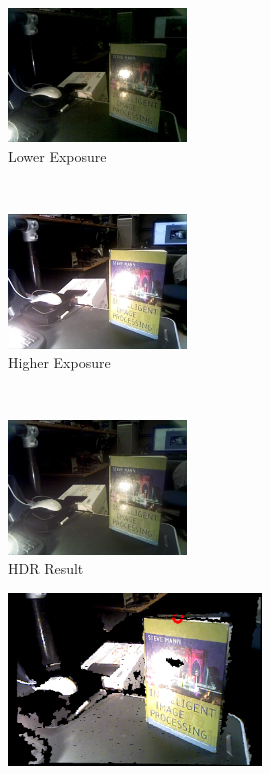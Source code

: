 \begin{figure}[t!]
    \centering
    \begin{subfigure}{0.32\textwidth}
        \centering
        \includegraphics[height=1.4in]{ch4/diagrams/hdr_results/low.jpg}
        \caption{Lower Exposure}
        \label{hdr_low_expos}
    \end{subfigure}%
    ~ 
    \begin{subfigure}{0.32\textwidth}
        \centering
        \includegraphics[height=1.4in]{ch4/diagrams/hdr_results/high.jpg}
        \caption{Higher Exposure}
        \label{hdr_high_expos}
    \end{subfigure}
    ~
    \begin{subfigure}{0.32\textwidth}
        \centering
        \includegraphics[height=1.4in]{ch4/diagrams/hdr_results/hdr2.jpg}
        \caption{HDR Result}
        \label{hdr_result}
    \end{subfigure}
    \centering
    \begin{subfigure}{0.4\textwidth}
        \centering
        \includegraphics[height=1.8in]{ch4/diagrams/hdr_results/no_hdr.jpg}

\end{subfigure}
\end{figure}
